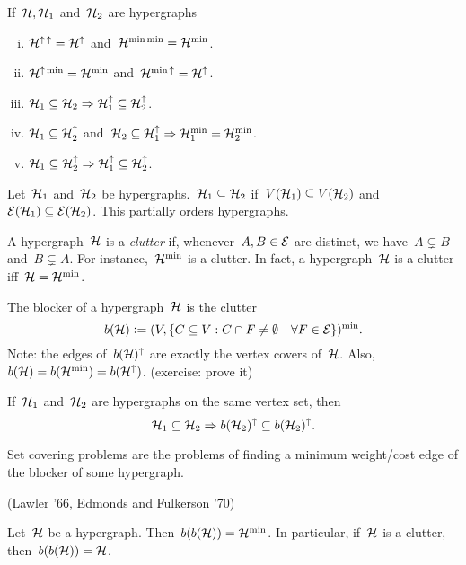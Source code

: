 \documentclass[main.tex]{subfiles}
\begin{document}
\begin{exercise}
	If~$\mathcal{H}, \mathcal{H}_1$ and~$\mathcal{H}_2$ are hypergraphs
	\begin{enumerate}[(i)]
		\item $\mathcal{H}^{\uparrow\,\uparrow} = \mathcal{H}^\uparrow$ and~$\mathcal{H}^{{\min}\,{\min}} = \mathcal{H}^{\min}$.
		\item $\mathcal{H}^{\uparrow\,\min} = \mathcal{H}^{\min}$ and~$\mathcal{H}^{{\min}\,\uparrow} = \mathcal{H}^\uparrow$.
		\item $\mathcal{H}_1 \subseteq \mathcal{H}_2 \Rightarrow \mathcal{H}_1^\uparrow \subseteq \mathcal{H}_2^\uparrow$.
		\item $\mathcal{H}_1 \subseteq \mathcal{H}_2^\uparrow$ and~$\mathcal{H}_2 \subseteq \mathcal{H}_1^\uparrow \Rightarrow \mathcal{H}_1^{\min} = \mathcal{H}_2^{\min}$.
		\item $\mathcal{H}_1 \subseteq \mathcal{H}_2^\uparrow \Rightarrow \mathcal{H}_1^\uparrow \subseteq \mathcal{H}_2^\uparrow$.
	\end{enumerate}
\end{exercise}

Let~$\mathcal{H}_1$ and~$\mathcal{H}_2$ be hypergraphs.~$\mathcal{H}_1 \subseteq \mathcal{H}_2$ if~$V(\mathcal{H}_1) \subseteq V(\mathcal{H}_2)$ and~$\mathcal{E}(\mathcal{H}_1) \subseteq \mathcal{E}(\mathcal{H}_2)$. This partially orders hypergraphs.

A hypergraph~$\mathcal{H}$ is a \emph{clutter} if, whenever~$A, B \in \mathcal{E}$ are distinct, we have~$A \subsetneq B$ and~$B \subsetneq A$. For instance,~$\mathcal{H}^{\min}$ is a clutter. In fact, a hypergraph~$\mathcal{H}$ is a clutter iff~$\mathcal{H} = \mathcal{H}^{\min}$.

The blocker of a hypergraph~$\mathcal{H}$ is the clutter
$$ b(\mathcal{H}) \vcentcolon= (V, \{C \subseteq V : C \cap F \neq \emptyset \quad \forall F \in \mathcal{E}\})^{\min}. $$
Note: the edges of~$b(\mathcal{H})^\uparrow$ are exactly the vertex covers of~$\mathcal{H}$. Also,~$b(\mathcal{H}) = b(\mathcal{H}^{\min}) = b(\mathcal{H}^\uparrow)$. (exercise: prove it)

\begin{exercise}
	If~$\mathcal{H}_1$ and~$\mathcal{H}_2$ are hypergraphs on the same vertex set, then~$$\mathcal{H}_1 \subseteq \mathcal{H}_2 \Rightarrow b(\mathcal{H}_2)^\uparrow \subseteq b(\mathcal{H}_2)^\uparrow. $$
\end{exercise}

Set covering problems are the problems of finding a minimum weight/cost edge of the blocker of some hypergraph.

\begin{theorem}
	(Lawler '66, Edmonds and Fulkerson '70)

	Let~$\mathcal{H}$ be a hypergraph. Then~$b(b(\mathcal{H})) = \mathcal{H}^{\min}$. In particular, if~$\mathcal{H}$ is a clutter, then~$b(b(\mathcal{H})) = \mathcal{H}$.
\end{theorem}
\end{document}

